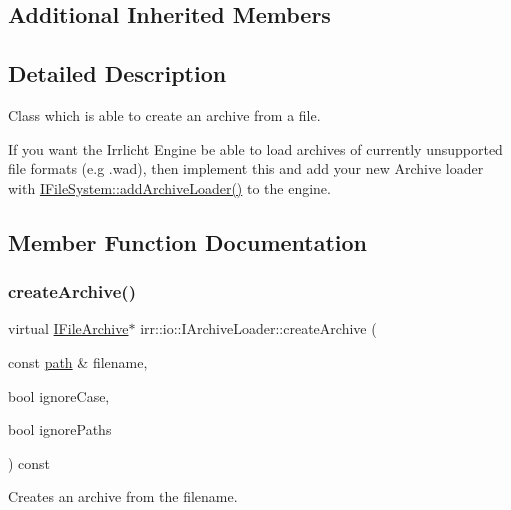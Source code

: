 \subsection*{Additional Inherited Members}


\subsection{Detailed Description}
Class which is able to create an archive from a file. 

If you want the Irrlicht Engine be able to load archives of currently unsupported file formats (e.\+g .wad), then implement this and add your new Archive loader with \hyperlink{classirr_1_1io_1_1IFileSystem_ad56456302b4697c49b461a909d9269b9}{I\+File\+System\+::add\+Archive\+Loader()} to the engine. 

\subsection{Member Function Documentation}
\mbox{\label{classirr_1_1io_1_1IArchiveLoader_a55e9586f190588e5fea6d17f63fb7aad}} 
\subsubsection{\texorpdfstring{create\+Archive()}{createArchive()}\hspace{0.1cm}{\footnotesize\ttfamily [1/2]}}
{\footnotesize\ttfamily virtual \hyperlink{classirr_1_1io_1_1IFileArchive}{I\+File\+Archive}$\ast$ irr\+::io\+::\+I\+Archive\+Loader\+::create\+Archive (\begin{DoxyParamCaption}\item[{const \hyperlink{namespaceirr_1_1io_ab1bdc45edb3f94d8319c02bc0f840ee1}{path} \&}]{filename,  }\item[{bool}]{ignore\+Case,  }\item[{bool}]{ignore\+Paths }\end{DoxyParamCaption}) const\hspace{0.3cm}{\ttfamily [pure virtual]}}



Creates an archive from the filename. 


